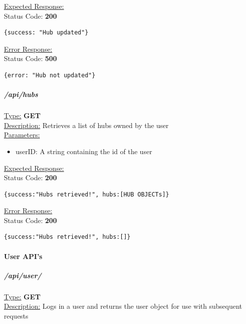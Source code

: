 \documentclass[draft,preprint,12pt,3p]{elsarticle}
\newcommand{\forceindent}{\leavevmode{\parindent=1em\indent}}
\begin{document}
\underline{Expected Response:}\\[5pt]
\forceindent Status Code: \textbf{200} \\
\begin{verbatim}
{success: "Hub updated"}
\end{verbatim}

\underline{Error Response:}\\[5pt]
\forceindent Status Code: \textbf{500} \\
\begin{verbatim}
{error: "Hub not updated"}
\end{verbatim}

\subparagraph*{/api/hubs}
\underline{Type:} \textbf{GET}\\

\underline{Description:} Retrieves a list of hubs owned by the user\\

\underline{Parameters:}
\begin{itemize}
\item userID: A string containing the id of the user
\end{itemize}
\underline{Expected Response:}\\[5pt]
\forceindent Status Code: \textbf{200} \\
\begin{verbatim}
{success:"Hubs retrieved!", hubs:[HUB OBJECTs]}
\end{verbatim}
\underline{Error Response:}\\[5pt]
\forceindent Status Code: \textbf{200} \\
\begin{verbatim}
{success:"Hubs retrieved!", hubs:[]}
\end{verbatim}


\paragraph{User API's}

\subparagraph*{/api/user/}
\underline{Type:} \textbf{GET}\\

\underline{Description:} Logs in a user and returns the user object for use with subsequent requests\\
\end{document}
